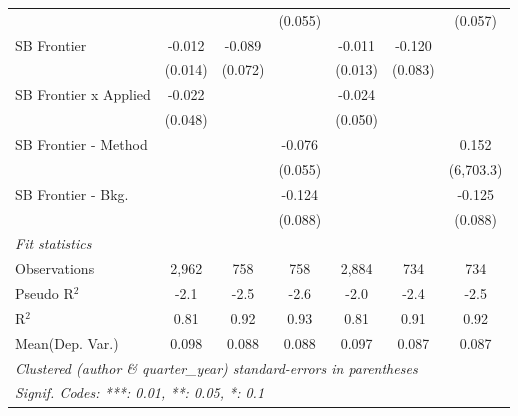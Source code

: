 \begin{tabular}{lcccccc}
                                &               &         & (0.055)     &               &         & (0.057)\\   
   SB Frontier                  & -0.012        & -0.089  &             & -0.011        & -0.120  &   \\   
                                & (0.014)       & (0.072) &             & (0.013)       & (0.083) &   \\   
   SB Frontier x Applied        & -0.022        &         &             & -0.024        &         &   \\   
                                & (0.048)       &         &             & (0.050)       &         &   \\   
   SB Frontier - Method         &               &         & -0.076      &               &         & 0.152\\   
                                &               &         & (0.055)     &               &         & (6,703.3)\\   
   SB Frontier - Bkg.           &               &         & -0.124      &               &         & -0.125\\   
                                &               &         & (0.088)     &               &         & (0.088)\\   
   \midrule
   \emph{Fit statistics}\\
   Observations                 & 2,962         & 758     & 758         & 2,884         & 734     & 734\\  
   Pseudo R$^2$                 & -2.1          & -2.5    & -2.6        & -2.0          & -2.4    & -2.5\\  
   R$^2$                        & 0.81          & 0.92    & 0.93        & 0.81          & 0.91    & 0.92\\  
Mean(Dep. Var.) & 0.098 & 0.088 & 0.088 & 0.097 & 0.087 & 0.087 \\
   \midrule \midrule
   \multicolumn{7}{l}{\emph{Clustered (author \& quarter\_year) standard-errors in parentheses}}\\
   \multicolumn{7}{l}{\emph{Signif. Codes: ***: 0.01, **: 0.05, *: 0.1}}\\
\end{tabular}
\par\endgroup
